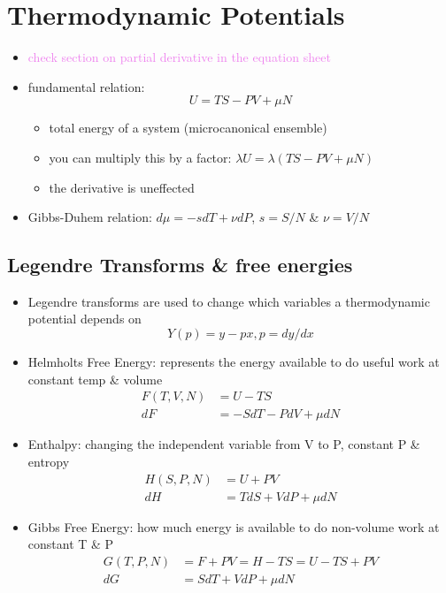 
\section{Thermodynamic Potentials}


\begin{itemize}
	\item \textcolor{violet}{check section on partial derivative in the equation sheet}
	\item fundamental relation:
	      \begin{equation}
		      U = TS - PV + \mu N
	      \end{equation}
	      \begin{itemize}
		      \item total energy of a system (microcanonical ensemble)
		      \item you can multiply this by a factor: $\lambda U = \lambda (TS - PV + \mu N)$
		      \item the derivative is uneffected
	      \end{itemize}
	\item Gibbs-Duhem relation: $d\mu = -s dT + \nu dP$, $s = S/N$ \& $\nu = V/N$
\end{itemize}

\subsection*{Legendre Transforms \& free energies}
\begin{itemize}
	\item Legendre transforms are used to change which variables a thermodynamic potential depends on
	      \begin{equation*}
		      Y(p) = y - px, p = dy/dx
	      \end{equation*}
	\item Helmholts Free Energy: represents the energy available to do useful work at constant temp \& volume
	      \begin{align*}
		      F(T,V, N) & = U - TS                \\
		      dF        & = -S dT - P dV + \mu dN
	      \end{align*}

	\item Enthalpy: changing the independent variable from V to P, constant P \& entropy
	      \begin{align*}
		      H(S, P, N) & = U + PV               \\
		      dH         & = T dS + V dP + \mu dN
	      \end{align*}

	\item Gibbs Free Energy: how much energy is available to do non-volume work at constant T \& P
	      \begin{align*}
		      G(T, P, N) & = F + PV = H - TS = U -TS + PV \\
		      dG         & = S dT + V dP + \mu dN
	      \end{align*}

\end{itemize}

